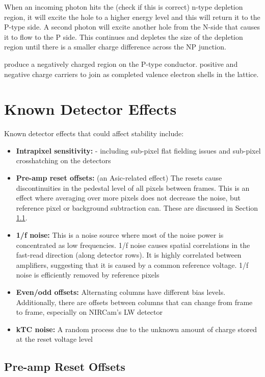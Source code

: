 \documentclass{aastex62}
\begin{document}
When an incoming photon hits the (check if this is correct) n-type depletion region, it will excite the hole to a higher energy level and this will return it to the P-type side.
A second photon will excite another hole from the N-side that causes it to flow to the P side.
This continues and depletes the size of the depletion region until there is a smaller charge difference across the NP junction.

produce a negatively charged region on the P-type conductor. positive and negative charge carriers to join as completed valence electron shells in the lattice.




\section{Known Detector Effects}

Known detector effects that could affect stability include:
\begin{itemize}[noitemsep]
	\item \textbf{Intrapixel sensitivity:} - including sub-pixel flat fielding issues and sub-pixel crosshatching on the detectors \citep{shapiro2018crosshatch}
	\item \textbf{Pre-amp reset offsets:} (an Asic-related effect) 
The resets cause discontinuities in the pedestal level of all pixels between frames. This is an effect where averaging over more pixels does not decrease the noise, but reference pixel or background subtraction can. These are discussed in Section \ref{sec:preAmp}.
	\item \textbf{1/f noise:} This is a noise source where most of the noise power is concentrated as low frequencies. 1/f noise causes spatial correlations in the fast-read direction (along detector rows). It is highly correlated between amplifiers, suggesting that it is caused by a common reference voltage. 1/f noise is efficiently removed by reference pixels
	\item \textbf{Even/odd offsets:} Alternating columns have different bias levels. Additionally, there are offsets between columns that can change from frame to frame, especially on NIRCam's LW detector
	\item \textbf{kTC noise:} A random process due to the unknown amount of charge stored at the reset voltage level
\end{itemize}

\subsection{Pre-amp Reset Offsets}\label{sec:preAmp}
\end{document}
